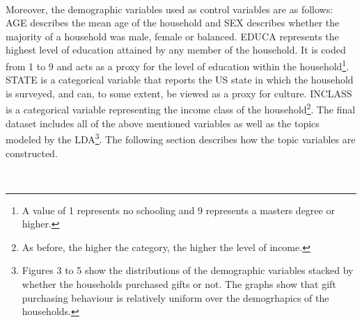 \

Moreover, the demographic variables used as control variables are as follows: AGE describes the mean age of the household and SEX describes whether the majority of a household was male, female or balanced. EDUCA represents the highest level of education attained by any member of the household. It is coded from 1 to 9 and acts as a proxy for the level of education within the household\footnote{A value of 1 represents no schooling and 9 represents a masters degree or higher.}. STATE is a categorical variable that reports the US state in which the household is surveyed, and can, to some extent, be viewed as a proxy for culture. INCLASS is a categorical variable representing the income class of the household\footnote{As before, the higher the category, the higher the level of income.}. The final dataset includes all of the above mentioned variables as well as the topics modeled by the LDA\footnote{Figures 3 to 5 show the distributions of the demographic variables stacked by whether the households purchased gifts or not. The graphs show that gift purchasing behaviour is relatively uniform over the demogrhapics of the households.}. The following section describes how the topic variables are constructed. 

\











